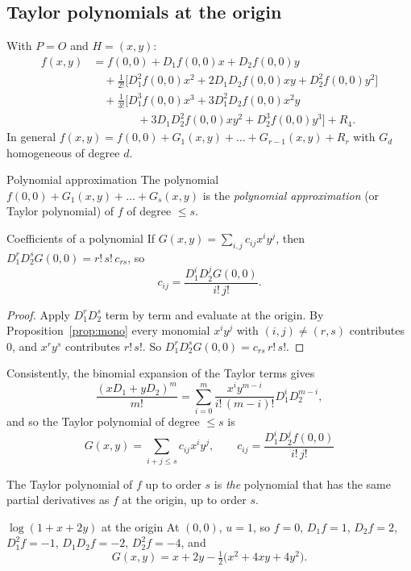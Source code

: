 \subsection{Taylor polynomials at the origin}

With $P=O$ and $H=(x,y)$:
\begin{align*}
f(x,y)&=f(0,0)+D_1f(0,0)x+D_2f(0,0)y\\
&\quad+\frac1{2!}\Big[D_1^2f(0,0)x^2+2D_1D_2f(0,0)xy+D_2^2f(0,0)y^2\Big]\\
&\quad+\frac1{3!}\Big[D_1^3f(0,0)x^3+3D_1^2D_2f(0,0)x^2y\\
&\qquad\qquad+3D_1D_2^2f(0,0)xy^2+D_2^3f(0,0)y^3\Big]+R_4 .
\end{align*}
In general $f(x,y)=f(0,0)+G_1(x,y)+\dots+G_{r-1}(x,y)+R_r$ with $G_d$ homogeneous of degree $d$.

\begin{definition}{Polynomial approximation}
The polynomial $f(0,0)+G_1(x,y)+\dots+G_s(x,y)$ is the \emph{polynomial approximation} (or
Taylor polynomial) of $f$ of degree $\le s$.
\end{definition}

\begin{proposition}{Coefficients of a polynomial}
If $G(x,y)=\sum_{i,j}c_{ij}x^iy^j$, then $D_1^rD_2^sG(0,0)=r!\,s!\,c_{rs}$, so
\[ c_{ij}=\frac{D_1^iD_2^jG(0,0)}{i!\,j!}. \]
\end{proposition}

\begin{proof}
Apply $D_1^rD_2^s$ term by term and evaluate at the origin. By
Proposition~\ref{prop:mono} every monomial $x^iy^j$ with $(i,j)\neq(r,s)$ contributes $0$,
and $x^ry^s$ contributes $r!\,s!$. So $D_1^rD_2^sG(0,0)=c_{rs}\,r!\,s!$.
\end{proof}

Consistently, the binomial expansion of the Taylor terms gives
\[
\frac{(xD_1+yD_2)^m}{m!}=\sum_{i=0}^m\frac{x^iy^{m-i}}{i!\,(m-i)!}D_1^iD_2^{m-i},
\]
and so the Taylor polynomial of degree $\le s$ is
\[
\boxed{\,G(x,y)=\sum_{i+j\le s}c_{ij}x^iy^j,\qquad c_{ij}=\frac{D_1^iD_2^jf(0,0)}{i!\,j!}\,}
\]

\begin{keyidea}
The Taylor polynomial of $f$ up to order $s$ is \emph{the} polynomial that has the same
partial derivatives as $f$ at the origin, up to order $s$.
\end{keyidea}

\begin{example}{$\log(1+x+2y)$ at the origin}
At $(0,0)$, $u=1$, so $f=0$, $D_1f=1$, $D_2f=2$, $D_1^2f=-1$, $D_1D_2f=-2$, $D_2^2f=-4$, and
\[ G(x,y)=x+2y-\tfrac12\big(x^2+4xy+4y^2\big). \]
\end{example}

